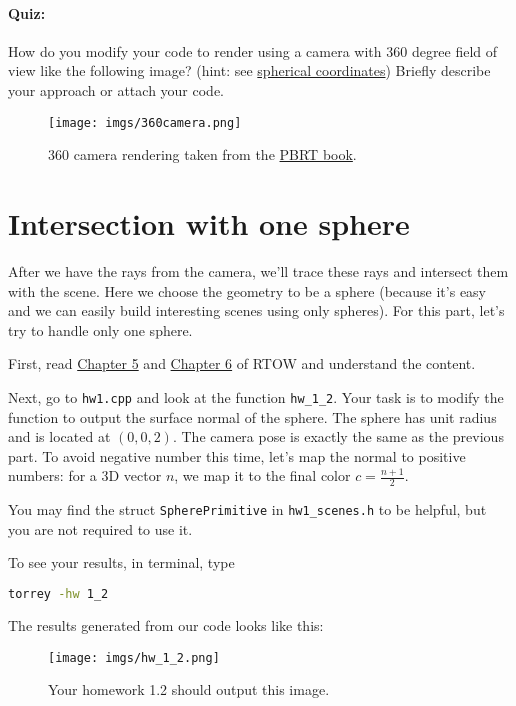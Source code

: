\paragraph{Quiz:} How do you modify your code to render using a camera with 360 degree field of view like the following image? (hint: see \href{https://en.wikipedia.org/wiki/Spherical_coordinate_system}{spherical coordinates}) Briefly describe your approach or attach your code.
\begin{figure}[h]
    \centering
    \texttt{[image: imgs/360camera.png]}
    \caption{360 camera rendering taken from the \href{https://www.pbr-book.org/3ed-2018/Camera_Models/Environment_Camera}{PBRT book}.}
    \label{fig:360_camera}
\end{figure}

\section{Intersection with one sphere}
After we have the rays from the camera, we'll trace these rays and intersect them with the scene. Here we choose the geometry to be a sphere (because it's easy and we can easily build interesting scenes using only spheres). For this part, let's try to handle only one sphere.

First, read \href{https://raytracing.github.io/books/RayTracingInOneWeekend.html\#addingasphere}{Chapter 5} and \href{https://raytracing.github.io/books/RayTracingInOneWeekend.html\#surfacenormalsandmultipleobjects}{Chapter 6} of RTOW and understand the content.

Next, go to \lstinline{hw1.cpp} and look at the function \lstinline{hw_1_2}. Your task is to modify the function to output the surface normal of the sphere. The sphere has unit radius and is located at $(0, 0, 2)$. The camera pose is exactly the same as the previous part. To avoid negative number this time, let's map the normal to positive numbers: for a 3D vector $n$, we map it to the final color $c = \frac{n + 1}{2}$.

You may find the struct \lstinline{SpherePrimitive} in \lstinline{hw1_scenes.h} to be helpful, but you are not required to use it.

To see your results, in terminal, type
\begin{lstlisting}[language=bash]
  torrey -hw 1_2
\end{lstlisting}

The results generated from our code looks like this:
\begin{figure}[h]
    \centering
    \texttt{[image: imgs/hw\_1\_2.png]}
    \caption{Your homework 1.2 should output this image.}
    \label{fig:hw_1_2}
\end{figure}

